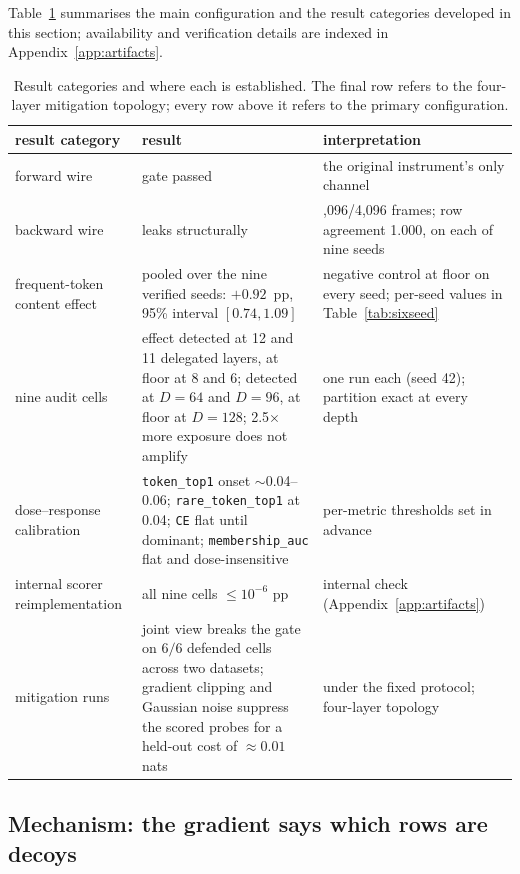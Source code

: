 \documentclass[11pt]{article}
\newcommand{\pp}{pp}
\begin{document}
Table~\ref{tab:summary} summarises the main configuration and the result
categories developed in this section; availability and verification details
are indexed in Appendix~\ref{app:artifacts}.

\begin{table}[H]
\centering\small
\begin{tabularx}{\textwidth}{@{}>{\raggedright\arraybackslash}p{2.3cm}>{\raggedright\arraybackslash}X>{\raggedright\arraybackslash}X@{}}
\toprule
result category & result & interpretation \\
\midrule
forward wire & gate passed & the original instrument's only channel \\
backward wire & leaks structurally & 4,096/4,096 frames; row agreement 1.000, on
  each of nine seeds \\
frequent-token content effect & pooled over the nine verified seeds:
  $+0.92$~\pp{}, 95\% interval $[0.74, 1.09]$ & negative control at floor on every
  seed; per-seed values in Table~\ref{tab:sixseed} \\
nine audit cells & effect detected at 12 and 11 delegated layers, at floor at
8 and 6; detected at $D{=}64$ and $D{=}96$, at floor at $D{=}128$; 2.5$\times$
more exposure does not amplify & one run each (seed 42); partition exact at
every depth \\
dose--response calibration & \texttt{token\_top1} onset $\sim$0.04--0.06;
  \texttt{rare\_token\_top1} at 0.04; \texttt{CE} flat until dominant;
  \texttt{membership\_auc} flat and dose-insensitive & per-metric thresholds
  set in advance \\
internal scorer reimplementation & all nine cells $\le 10^{-6}$ pp &
  internal check (Appendix~\ref{app:artifacts}) \\
\midrule
mitigation runs & joint view breaks the gate on $6/6$ defended cells across
  two datasets; gradient clipping and Gaussian noise suppress the scored probes
  for a held-out cost of $\approx 0.01$ nats & under the fixed protocol; four-layer topology \\
\bottomrule
\end{tabularx}


\caption{Result categories and where each is established. The final row refers
to the four-layer mitigation topology; every row above it refers to the primary
configuration.}
\label{tab:summary}
\end{table}

\subsection{Mechanism: the gradient says which rows are decoys}
\label{sec:mechanism}
\end{document}
